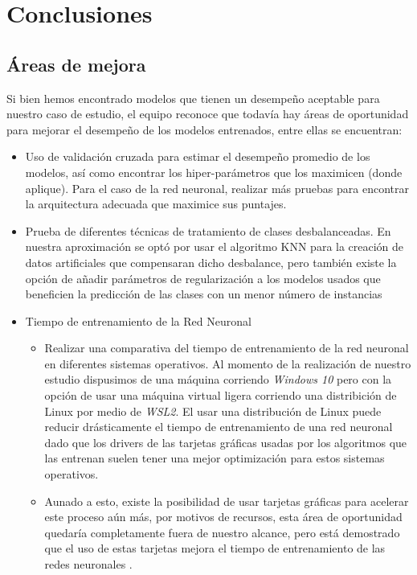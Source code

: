 \documentclass[journal]{IEEEtran}                                                          %
\begin{document}
    \section{Conclusiones} \label{conclusiones}
        
        \subsection{Áreas de mejora} \label{improvements}

            Si bien hemos encontrado modelos que tienen un desempeño aceptable para nuestro caso de estudio, el equipo reconoce que todavía hay áreas de oportunidad para mejorar el desempeño de los modelos entrenados, entre ellas se encuentran:
                
            \begin{itemize}
                \item Uso de validación cruzada para estimar el desempeño promedio de los modelos, así como encontrar los hiper-parámetros que los maximicen (donde aplique). Para el caso de la red neuronal, realizar más pruebas para encontrar la arquitectura adecuada que maximice sus puntajes.
                \item Prueba de diferentes técnicas de tratamiento de clases desbalanceadas. En nuestra aproximación se optó por usar el algoritmo KNN para la creación de datos artificiales que compensaran dicho desbalance, pero también existe la opción de añadir parámetros de regularización a los modelos usados que beneficien la predicción de las clases con un menor número de instancias
                \item Tiempo de entrenamiento de la Red Neuronal \begin{itemize}
                    \item Realizar una comparativa del tiempo de entrenamiento de la red neuronal en diferentes sistemas operativos. Al momento de la realización de nuestro estudio dispusimos de una máquina corriendo \emph{Windows 10} pero con la opción de usar una máquina virtual ligera corriendo una distribición de Linux por medio de \emph{WSL2}. El usar una distribución de Linux puede reducir drásticamente el tiempo de entrenamiento de una red neuronal dado que los drivers de las tarjetas gráficas usadas por los algoritmos que las entrenan suelen tener una mejor optimización para estos sistemas operativos.
                    \item Aunado a esto, existe la posibilidad de usar tarjetas gráficas para acelerar este proceso aún más, por motivos de recursos, esta área de oportunidad quedaría completamente fuera de nuestro alcance, pero está demostrado que el uso de estas tarjetas mejora el tiempo de entrenamiento de las redes neuronales \cite{likhith-k-2019}.
                \end{itemize}
            \end{itemize}
            
\end{document}
